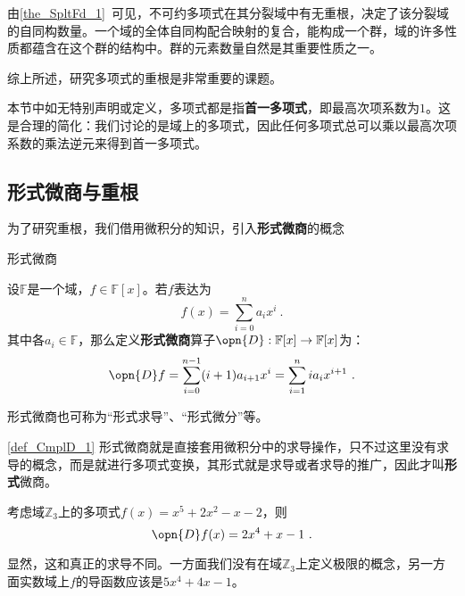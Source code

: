 



由\autoref{the_SpltFd_1}~可见，不可约多项式在其分裂域中有无重根，决定了该分裂域的自同构数量。一个域的全体自同构配合映射的复合，能构成一个群，域的许多性质都蕴含在这个群的结构中。群的元素数量自然是其重要性质之一。

综上所述，研究多项式的重根是非常重要的课题。

本节中如无特别声明或定义，多项式都是指\textbf{首一多项式}，即最高次项系数为$1$。这是合理的简化：我们讨论的是域上的多项式，因此任何多项式总可以乘以最高次项系数的乘法逆元来得到首一多项式。

\subsection{形式微商与重根}

为了研究重根，我们借用微积分的知识，引入\textbf{形式微商}的概念

\begin{definition}{形式微商}\label{def_CmplD_1}

设$\mathbb{F}$是一个域，$f\in\mathbb{F}[x]$。若$f$表达为
\begin{equation}
f(x) = \sum_{i=0}^n a_ix^i~.
\end{equation}
其中各$a_i\in\mathbb{F}$，那么定义\textbf{形式微商}算子$\opn{D}:\mathbb{F}[x]\to\mathbb{F}[x]$为：
\begin{equation}
\opn{D}f = \sum_{i=0}^{n-1} (i+1)a_{i+1}x^i = \sum_{i=1}^{n} ia_{i}x^{i+1}~.
\end{equation}

形式微商也可称为“形式求导”、“形式微分”等。

\end{definition}

\autoref{def_CmplD_1} 形式微商就是直接套用微积分中的求导操作，只不过这里没有求导的概念，而是就进行多项式变换，其形式就是求导或者求导的推广，因此才叫\textbf{形式}微商。

\begin{example}{}
考虑域$\mathbb{Z}_3$上的多项式$f(x)=x^5+2x^2-x-2$，则
\begin{equation}
\opn{D}f(x) = 2x^4+x-1~.
\end{equation}

显然，这和真正的求导不同。一方面我们没有在域$\mathbb{Z}_3$上定义极限的概念，另一方面实数域上$f$的导函数应该是$5x^4+4x-1$。
\end{example}

